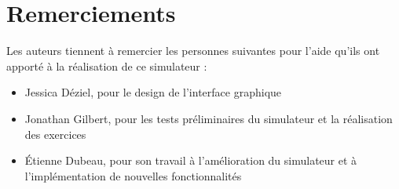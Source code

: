 \documentclass{tufte-handout}
\begin{document}
\clearpage
\section{Remerciements}

Les auteurs tiennent à remercier les personnes suivantes pour l'aide qu'ils ont apporté à la réalisation de ce simulateur :
\begin{itemize}
	\item Jessica Déziel, pour le design de l'interface graphique
	\item Jonathan Gilbert, pour les tests préliminaires du simulateur et la réalisation des exercices
	\item Étienne Dubeau, pour son travail à l'amélioration du simulateur et à l'implémentation de nouvelles fonctionnalités
\end{itemize}
\end{document}
